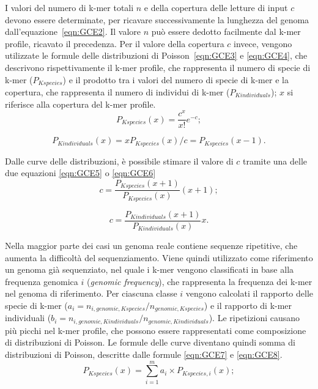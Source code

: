 \documentclass[crop=false, class=book]{standalone}
\begin{document}
	I valori del numero di k-mer totali $n$ e della copertura delle letture di input $c$ devono essere determinate, per ricavare successivamente la lunghezza del genoma dall'equazione~\vref{eqn:GCE2}. Il valore $n$ può essere dedotto facilmente dal k-mer profile, ricavato il precedenza. Per il valore della copertura $c$ invece, vengono utilizzate le formule delle distribuzioni di Poisson~\vref{eqn:GCE3} e \vref{eqn:GCE4}, che descrivono rispettivamente il k-mer profile, che rappresenta il numero di specie di k-mer ($P_{Kspecies}$) e il prodotto tra i valori del numero di specie di k-mer e la copertura, che rappresenta il numero di individui di k-mer ($P_{Kindividuals}$); $x$ si riferisce alla copertura del k-mer profile.
	\begin{equation}
		\label{eqn:GCE3}
		P_{Kspecies}(x) = \frac{c^x}{x!} e^{-c};
	\end{equation}

	\begin{equation}
		\label{eqn:GCE4}
		P_{Kindividuals}(x) = x P_{Kspecies}(x) / c = P_{Kspecies}(x-1).
	\end{equation}
	
	Dalle curve delle distribuzioni, è possibile stimare il valore di $c$ tramite una delle due equazioni \vref{eqn:GCE5} o \vref{eqn:GCE6}
	\begin{equation}
		\label{eqn:GCE5}
		c = \frac{P_{Kspecies}(x+1)}{P_{Kspecies}(x)} (x+1);
	\end{equation}
	
	\begin{equation}
		\label{eqn:GCE6}
		c = \frac{P_{Kindividuals}(x+1)}{P_{Kindividuals}(x)} x.
	\end{equation}

	Nella maggior parte dei casi un genoma reale contiene sequenze ripetitive, che aumenta la difficoltà del sequenziamento. Viene quindi utilizzato come riferimento un genoma già sequenziato, nel quale i k-mer vengono classificati in base alla frequenza genomica $i$ (\textit{genomic frequency}), che rappresenta la frequenza dei k-mer nel genoma di riferimento. Per ciascuna classe $i$ vengono calcolati il rapporto delle specie di k-mer ($a_i = n_{i, genomic, Kspecies} / n_{genomic, Kspecies}$) e il rapporto di k-mer individuali ($b_i = n_{i, genomic, Kindividuals} / n_{genomic, Kindividuals}$). 
	Le ripetizioni causano più picchi nel k-mer profile, che possono essere rappresentati come composizione di distribuzioni di Poisson. Le formule delle curve diventano quindi somma di distribuzioni di Poisson, descritte dalle formule \vref{eqn:GCE7} e \vref{eqn:GCE8}.
	\begin{equation}
		\label{eqn:GCE7}
		P_{Kspecies}(x) = \sum_{i=1}^{m} a_i \times P_{Kspecies, i}(x);
	\end{equation}
	
\end{document}
